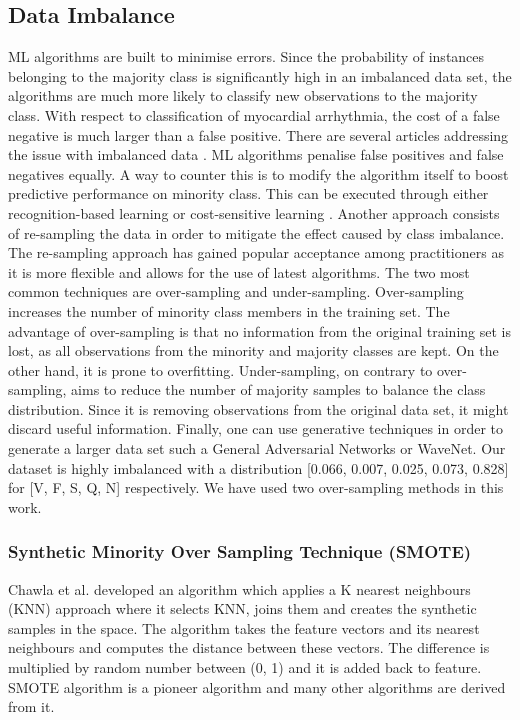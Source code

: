 \documentclass[a4paper,10pt,twocolumn]{article}
\begin{document}
\subsection{Data Imbalance}
\label{sec:data_imb}

ML algorithms are built to minimise errors. Since the probability of instances belonging to the majority class is significantly high in an imbalanced data set, the algorithms are much more likely to classify new observations to the majority class. With respect to classification of myocardial arrhythmia, the cost of a false negative is much larger than a false positive. There are several articles addressing the issue with imbalanced data \cite{imb1, imb3}. ML algorithms penalise false positives and false negatives equally. A way to counter this is to modify the algorithm itself to boost predictive performance on minority class. This can be executed through either recognition-based learning \cite{imb4} or cost-sensitive learning \cite{imb5}. Another approach consists of re-sampling the data in order to mitigate the effect caused by class imbalance. The re-sampling approach has gained popular acceptance among practitioners as it is more flexible and allows for the use of latest algorithms. The two most common techniques are over-sampling and under-sampling. Over-sampling increases the number of minority class members in the training set. The advantage of over-sampling is that no information from the original training set is lost, as all observations from the minority and majority classes are kept. On the other hand, it is prone to overfitting. Under-sampling, on contrary to over-sampling, aims to reduce the number of majority samples to balance the class distribution. Since it is removing observations from the original data set, it might discard useful information. Finally, one can use generative techniques in order to generate a larger data set such a General Adversarial Networks or WaveNet. Our dataset is highly imbalanced with a distribution [0.066, 0.007, 0.025, 0.073, 0.828] for [V, F, S, Q, N] respectively. We have used two over-sampling methods in this work.


\subsubsection{Synthetic Minority Over Sampling Technique (SMOTE)}
Chawla et al. \cite{smote} developed an algorithm which applies a K nearest neighbours (KNN) approach where it selects KNN, joins them and creates the synthetic samples in the space. The algorithm takes the feature vectors and its nearest neighbours and computes the distance between these vectors. The difference is multiplied by random number between (0, 1) and it is added back to feature. SMOTE algorithm is a pioneer algorithm and many other algorithms are derived from it.
\end{document}
